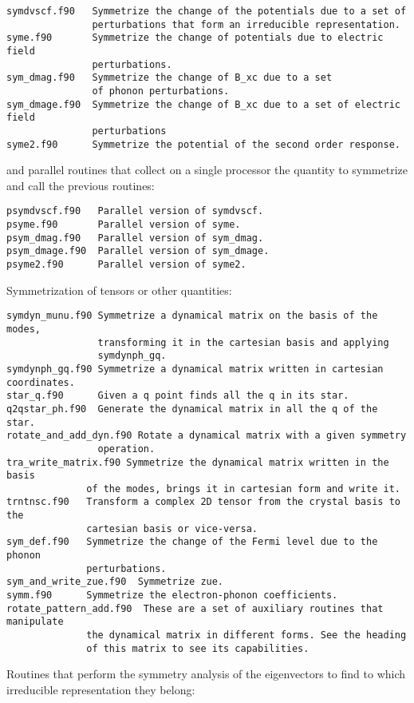 \documentclass[12pt,a4paper]{article}
\begin{document}
\begin{verbatim}
symdvscf.f90   Symmetrize the change of the potentials due to a set of
               perturbations that form an irreducible representation.
syme.f90       Symmetrize the change of potentials due to electric field
               perturbations.
sym_dmag.f90   Symmetrize the change of B_xc due to a set
               of phonon perturbations.
sym_dmage.f90  Symmetrize the change of B_xc due to a set of electric field
               perturbations
syme2.f90      Symmetrize the potential of the second order response.
\end{verbatim}

and parallel routines that collect on a single processor 
the quantity to symmetrize and call the previous routines:

\begin{verbatim}
psymdvscf.f90   Parallel version of symdvscf.
psyme.f90       Parallel version of syme.
psym_dmag.f90   Parallel version of sym_dmag.
psym_dmage.f90  Parallel version of sym_dmage.
psyme2.f90      Parallel version of syme2.
\end{verbatim}

Symmetrization of tensors or other quantities:

\begin{verbatim}
symdyn_munu.f90 Symmetrize a dynamical matrix on the basis of the modes,
                transforming it in the cartesian basis and applying
                symdynph_gq.
symdynph_gq.f90 Symmetrize a dynamical matrix written in cartesian coordinates.
star_q.f90      Given a q point finds all the q in its star. 
q2qstar_ph.f90  Generate the dynamical matrix in all the q of the star.
rotate_and_add_dyn.f90 Rotate a dynamical matrix with a given symmetry
                operation.
tra_write_matrix.f90 Symmetrize the dynamical matrix written in the basis 
              of the modes, brings it in cartesian form and write it.
trntnsc.f90   Transform a complex 2D tensor from the crystal basis to the 
              cartesian basis or vice-versa.
sym_def.f90   Symmetrize the change of the Fermi level due to the phonon
              perturbations.
sym_and_write_zue.f90  Symmetrize zue.
symm.f90      Symmetrize the electron-phonon coefficients.
rotate_pattern_add.f90  These are a set of auxiliary routines that manipulate
              the dynamical matrix in different forms. See the heading
              of this matrix to see its capabilities.
\end{verbatim}

Routines that perform the symmetry analysis of the eigenvectors to find
to which irreducible representation they belong:
\end{document}
